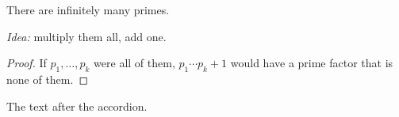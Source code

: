 \begin{theorem}
There are infinitely many primes.
\end{theorem}
\begin{webaccordion}
\begin{webpane}[collapsed]
\noindent\textit{Idea:} multiply them all, add one. \webnextpane[Proof]
\end{webpane}
\begin{webpane}[expanded]
\begin{proof}\hfill\webprevpane[Less]\par
If $p_1, \dots, p_k$ were all of them, $p_1 \cdots p_k + 1$ would have a
prime factor that is none of them.
\end{proof}
\end{webpane}
\end{webaccordion}
The text after the accordion.
